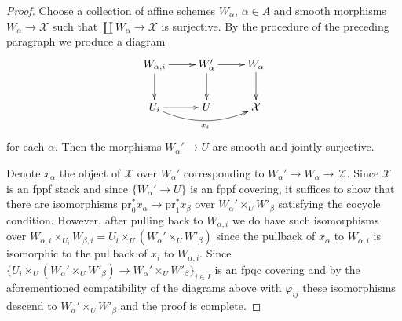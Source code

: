 \documentclass[10pt,a4paper]{amsart}
\theoremstyle{plain}
\theoremstyle{definition}
\theoremstyle{remark}
\numberwithin{equation}{subsection}
\begin{document}
\begin{proof}
\medskip\noindent
Choose a collection of affine schemes $W_\alpha$, $\alpha \in A$
and smooth morphisms $W_\alpha \to \mathcal{X}$ such that
$\coprod W_\alpha \to \mathcal{X}$ is surjective.
By the procedure of the preceding paragraph we produce
a diagram
$$
\xymatrix{
W_{\alpha, i} \ar[d] \ar[r] &
W_\alpha' \ar[d] \ar[r] &
W_\alpha \ar[d] \\
U_i \ar[r] \ar@/_1pc/[rr]_{x_i} &
U &
\mathcal{X}
}
$$
for each $\alpha$. Then the morphisms $W_\alpha' \to U$ are
smooth and jointly surjective.

\medskip\noindent
Denote $x_\alpha$ the object of $\mathcal{X}$ over $W_\alpha'$
corresponding to $W_\alpha' \to W_\alpha \to \mathcal{X}$.
Since $\mathcal{X}$ is an fppf stack and since
$\{W_\alpha' \to U\}$ is an fppf covering, it suffices
to show that there are isomorphisms
$\text{pr}_0^*x_\alpha \to \text{pr}_1^*x_\beta$
over $W_\alpha' \times_U W'_\beta$ satisfying the
cocycle condition. However, after pulling back to
$W_{\alpha, i}$ we do have such isomorphisms over
$W_{\alpha, i} \times_{U_i} W_{\beta, i} =
U_i \times_U (W_\alpha' \times_U W'_\beta)$
since the pullback of $x_\alpha$ to $W_{\alpha, i}$
is isomorphic to the pullback of $x_i$ to $W_{\alpha, i}$.
Since $\{U_i \times_U (W_\alpha' \times_U W'_\beta) \to
W_\alpha' \times_U W'_\beta\}_{i \in I}$
is an fpqc covering and by the aforementioned compatibility
of the diagrams above with $\varphi_{ij}$ these
isomorphisms descend to $W_\alpha' \times_U W'_\beta$
and the proof is complete.
\end{proof}
\end{document}
